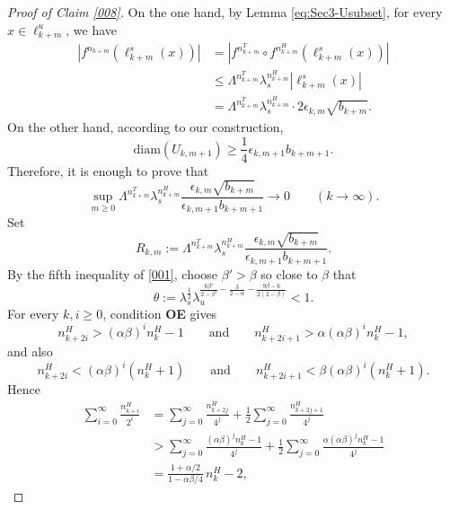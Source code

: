 \documentclass{amsart}
\theoremstyle{plain}
\theoremstyle{definition}
\theoremstyle{remark}
\numberwithin{equation}{section}
\begin{document}
\begin{proof}[Proof of Claim \ref{008}]
On the one hand, by Lemma \ref{eq:Sec3-Usubset}, for every $x\in\ell^u_{k+m}$, we have 
\begin{align*}
|f^{n_{k+m}}(\ell^s_{k+m}(x))|
&=
|f^{n^T_{k+m}}\circ f^{n^H_{k+m}}(\ell^s_{k+m}(x))|\\
&\le
\Lambda^{n_{k+m}^T}\lambda_s^{n_{k+m}^H}|\ell^s_{k+m}(x)|\\
&=
\Lambda^{n_{k+m}^T}\lambda_s^{n^H_{k+m}}\cdot 2\epsilon_{k,m}\sqrt{b_{k+m}}.
\end{align*}
On the other hand, according to our construction,
\[
\mathrm{diam}(U_{k,m+1})\ge \frac{1}{4}\epsilon_{k,m+1}b_{k+m+1}.
\]
Therefore, it is enough to prove that
\begin{equation}\label{009}
\sup_{m\ge 0}
\Lambda^{n_{k+m}^T}\lambda_s^{n^H_{k+m}}
\frac{\epsilon_{k,m}\sqrt{b_{k+m}}}{\epsilon_{k,m+1}b_{k+m+1}}
\longrightarrow 0
\qquad (k\to\infty).
\end{equation}
Set
\[
R_{k,m}:=
\Lambda^{n_{k+m}^T}\lambda_s^{n^H_{k+m}}
\frac{\epsilon_{k,m}\sqrt{b_{k+m}}}{\epsilon_{k,m+1}b_{k+m+1}}.
\]
By the fifth inequality of \eqref{001}, choose $\beta'>\beta$ so close to $\beta$ that
\begin{equation}\label{015}
\theta:=\lambda_s^{\frac12}
\lambda_u^{\frac{6\beta'}{2-\beta'}-\frac{3}{2-\alpha}-\frac{9\beta-6}{2(2-\beta)}}<1.
\end{equation}
For every $k,i\ge0$, condition {\bf OE} gives
\begin{equation}\label{351}
n_{k+2i}^H>(\alpha\beta)^i n_k^H-1
\qquad\text{and}\qquad
n_{k+2i+1}^H>\alpha(\alpha\beta)^i n_k^H-1,
\end{equation}
and also
\[
n_{k+2i}^H<(\alpha\beta)^i(n_k^H+1)
\qquad\text{and}\qquad
n_{k+2i+1}^H<\beta(\alpha\beta)^i(n_k^H+1).
\]
Hence
\begin{align*}
\sum_{i=0}^\infty \frac{n_{k+i}^H}{2^i}
&=
\sum_{j=0}^\infty \frac{n_{k+2j}^H}{4^j}
+\frac12\sum_{j=0}^\infty \frac{n_{k+2j+1}^H}{4^j}\\
&>
\sum_{j=0}^\infty \frac{(\alpha\beta)^j n_k^H-1}{4^j}
+\frac12\sum_{j=0}^\infty \frac{\alpha(\alpha\beta)^j n_k^H-1}{4^j}\\
&=
\frac{1+\alpha/2}{1-\alpha\beta/4}\,n_k^H-2,

\end{align*}
\end{proof}
\end{document}
